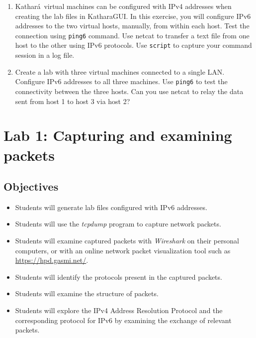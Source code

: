 \documentclass[12pt]{book}
\newcommand{\kathara}{Kathar\'a}
\begin{document}
\begin{enumerate}[1.]
\item\label{ipv6.ex} \kathara\ virtual machines can be configured with
  IPv4 addresses 
  when creating the lab files in KatharaGUI. In this exercise, you
  will configure IPv6 addresses to the two virtual hosts, manually,
  from within each host. Test the connection using \verb$ping6$
  command. Use netcat to transfer a text file from one host to the
  other using IPv6 protocols. Use \verb$script$ to capture your
  command session in a log file.

\item Create a lab with three virtual machines connected to a single
  LAN. Configure IPv6 addresses to all three machines. Use
  \verb$ping6$ to test the connectivity between the three hosts. Can
  you use netcat to relay the data sent from host 1 to host 3 via host
  2?
\end{enumerate}



\chapter{Lab 1: Capturing and examining packets }\label{tcpdump.se}

\section{Objectives}

\begin{itemize}[--]
  \item Students will generate lab files configured with IPv6
    addresses. 
\item Students will use the \emph{tcpdump} program to capture network
  packets. 
\item Students will examine captured packets with
  \emph{Wireshark} on their personal computers, or with an online
  network packet visualization tool such as
  \url{https://hpd.gasmi.net/}. 
\item Students will identify the protocols
  present in the captured packets. 
\item Students will examine the structure of packets. 
\item Students will explore the IPv4 Address Resolution Protocol and
  the corresponding protocol for IPv6 by examining the exchange of
  relevant packets.

\end{itemize}
\end{document}
